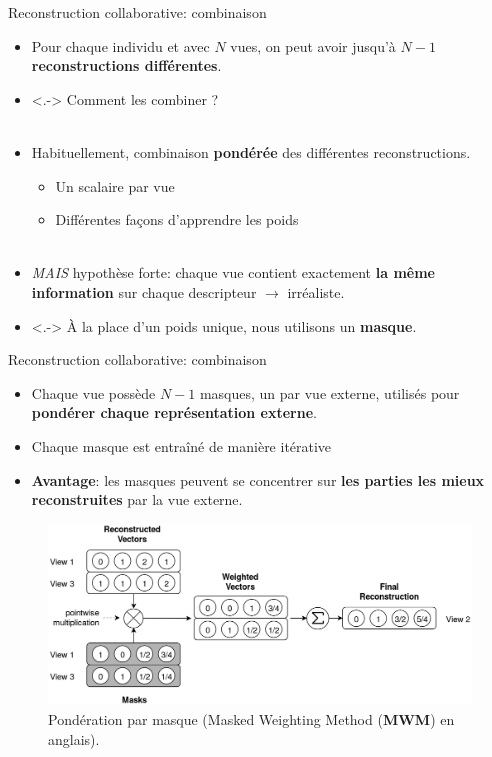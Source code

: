 \documentclass[hyperref={pdfpagelabels=false}]{beamer}
\begin{document}
    \begin{frame}{Reconstruction collaborative: combinaison}
        \begin{itemize}
            \item<+-> Pour chaque individu et avec $N$ vues, on peut avoir 
                jusqu'à $N-1$ \textbf{reconstructions différentes}.
            \item<.-> Comment les combiner ?\\~\\
            \item<+-> Habituellement, combinaison \textbf{pondérée} des 
                différentes reconstructions.
                \begin{itemize}
                    \item Un scalaire par vue
                    \item Différentes façons d'apprendre les poids\\~\\
                \end{itemize}
            \item<+-> \textit{MAIS} hypothèse forte: chaque vue contient 
                exactement \textbf{la même information} sur chaque descripteur 
                $\rightarrow$ irréaliste.
            \item<.-> À la place d'un poids unique, nous utilisons un 
                \textbf{masque}.
        \end{itemize}
    \end{frame}

    \begin{frame}{Reconstruction collaborative: combinaison}
        \begin{itemize}
            \item Chaque vue possède $N-1$ masques, un par vue externe, utilisés 
                pour \textbf{pondérer chaque représentation externe}.
            \item Chaque masque est entraîné de manière itérative
            \item \textbf{Avantage}: les masques peuvent se concentrer sur 
                \textbf{les parties les mieux reconstruites} par la vue externe.
        \end{itemize}
        \begin{figure}[b]
            \centering
            \includegraphics[scale=.17]{mwm.png}
            \caption{Pondération par masque (Masked Weighting Method
                (\textbf{MWM}) en anglais).
            }
        \end{figure}
    \end{frame}
\end{document}
